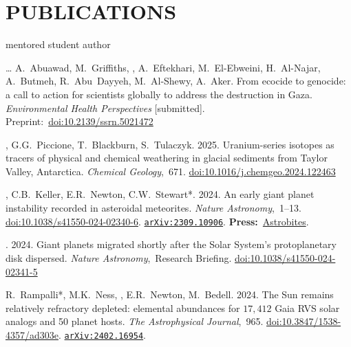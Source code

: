 \section*{PUBLICATIONS}
\hfill* mentored student author
\newcommand{\inprep}[1]{\textit{#1} [in prep.]}
\newcommand{\submitted}[1]{\textit{#1} [submitted]}
\newcommand{\inreview}[1]{\textit{#1} [in review]}
\newcommand{\inpress}[1]{\textit{#1} [in press]}
\newcommand{\doi}[1]{\href{https://doi.org/#1}{doi:#1}}
\newcommand{\arxiv}[1]{\href{https://arxiv.org/abs/#1}{\texttt{arXiv:#1}}}
\newcommand{\press}[2]{\textbf{Press:}~\href{#1}{#2}}
\newcommand{\pub}[2]{\textit{#1},~#2}

\begin{etaremune} [itemsep=4pt, leftmargin=3ex]
    \item[\dots] A.~Abuawad, M.~Griffiths, \ghedwards, A.~Eftekhari, M.~El-Ebweini, H.~Al-Najar, A.~Butmeh, R.~Abu~Dayyeh, M.~Al-Shewy, A.~Aker. From ecocide to genocide: a call to action for scientists globally to address the destruction in Gaza. \submitted{Environmental Health Perspectives}. Preprint:~\doi{10.2139/ssrn.5021472}
 
    \item \ghedwards, G.G.~Piccione, T.~Blackburn,  S.~Tulaczyk. 2025. Uranium-series isotopes as tracers of physical and chemical weathering in glacial sediments from Taylor Valley, Antarctica. \pub{Chemical Geology}{671}. \doi{10.1016/j.chemgeo.2024.122463}
        
    \item \ghedwards, C.B.~Keller, E.R.~Newton, C.W.~Stewart*. 2024. An early giant planet instability recorded in asteroidal meteorites. \pub{Nature Astronomy}{1--13}. \doi{10.1038/s41550-024-02340-6}. \arxiv{2309.10906}. \press{https://astrobites.org/2023/09/25/meteorites-planet-migration/}{Astrobites}.
    
    \item \ghedwards. 2024. Giant planets migrated shortly after the Solar System’s protoplanetary disk dispersed. \pub{Nature Astronomy} Research Briefing. \doi{10.1038/s41550-024-02341-5}
    
    \item R.~Rampalli*, M.K.~Ness, \ghedwards, E.R.~Newton, M.~Bedell. 2024. The Sun remains relatively refractory depleted: elemental abundances for $17,412$ Gaia RVS solar analogs and 50 planet hosts. \pub{The Astrophysical Journal}{965}. \doi{10.3847/1538-4357/ad303e}. \arxiv{2402.16954}.
    

\end{etaremune}
